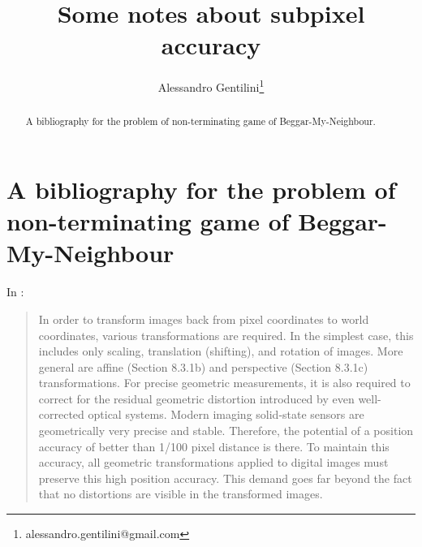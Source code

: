 \documentclass[a4paper,12pt]{article}
\title{Some notes about subpixel accuracy}
\author{Alessandro Gentilini\thanks{alessandro.gentilini@gmail.com}}
\begin{document}
\maketitle

\begin{abstract}
A bibliography for the problem of non-terminating game of Beggar-My-Neighbour.
\end{abstract} 

\section{A bibliography for the problem of non-terminating game of 
Beggar-My-Neighbour}

In \cite[section 8.2, p.270]{Jahne:2004:PHI:983100}:
\begin{quotation}
In order to transform images back from pixel coordinates to world coordinates,
various transformations are required. In the simplest case, this
includes only scaling,
translation (shifting), and rotation of images. More general are
affine (Section 8.3.1b)
and perspective (Section 8.3.1c) transformations. For precise
geometric measurements,
it is also required to correct for the residual geometric distortion
introduced by even
well-corrected optical systems. Modern imaging solid-state sensors are
geometrically
very precise and stable. Therefore, the potential of a position
accuracy of better than
1/100 pixel distance is there. To maintain this accuracy, all
geometric transformations
applied to digital images must preserve this high position accuracy.
This demand goes
far beyond the fact that no distortions are visible in the transformed images.
\end{quotation}

\printbibliography
\end{document}
